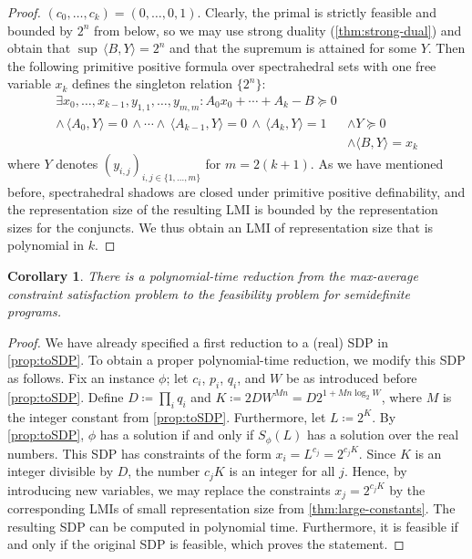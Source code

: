 \documentclass[11pt]{article}
\newtheorem{corollary}[theorem]{Corollary}
\theoremstyle{definition}
\theoremstyle{remark}
\begin{document}
\begin{proof}
    $(c_0,\dots,c_k) = (0,\dots,0,1)$. 
    Clearly, the primal is strictly feasible and bounded by $2^{n}$ from below, so we may use strong duality (\cref{thm:strong-dual})
    and obtain that $\sup \, \langle B,Y \rangle = 2^{n}$ and that the supremum is attained for some $Y$. 
    Then the following primitive positive formula over spectrahedral sets 
    with one free variable $x_k$ defines the singleton relation $\{2^{n}\}$: 
    \begin{align*}
        \exists x_0,\dots,x_{k-1}, y_{1,1},\dots,y_{m,m}: A_0 x_0 + \cdots + A_k - B \succeq 0 & \\
        \wedge \, \langle A_0,Y \rangle = 0 \, \wedge \cdots \wedge \, \langle A_{k-1},Y \rangle = 0 \, \wedge \, \langle A_k,Y \rangle = 1 
        & \wedge Y \succeq 0 \\
        & \wedge \langle B,Y \rangle = x_k 
    \end{align*}
    where $Y$ denotes $(y_{i,j})_{i,j \in \{1,\dots,m\}}$ for $m = 2(k+1)$. As we have mentioned before, spectrahedral shadows are closed under primitive positive definability, and the representation size of the resulting LMI is bounded by the representation sizes for the conjuncts. We thus obtain an LMI of 
    representation size that is polynomial in $k$.
\end{proof}

\begin{corollary}\label{cor:MaxAv-SDP}
    There is a polynomial-time reduction from the max-average constraint satisfaction problem to the feasibility problem for semidefinite programs. 
\end{corollary}
\begin{proof}
    We have already specified a first reduction to a (real) SDP in \cref{prop:toSDP}. 
    To obtain a proper polynomial-time reduction, we modify this SDP as follows. 
    Fix an instance $\phi$; let $c_i$, $p_i$, $q_i$, and $W$ be as introduced before \cref{prop:toSDP}. Define $D \coloneqq \prod_i q_i$ and $K \coloneqq 2D W^{Mn} = D2^{1 + Mn \log_2 W}$, where $M$ is the integer constant from \cref{prop:toSDP}. Furthermore, let $L \coloneqq 2^K$.
    By \cref{prop:toSDP}, $\phi$ has a solution if and only if $S_\phi(L)$ 
    has a solution over the real numbers.
    This SDP has constraints of the form $x_i = L^{c_j} = 2^{c_jK}$.
    Since $K$ is an integer divisible by $D$, the number $c_jK$ is an integer for all $j$. Hence, by introducing new variables, we may 
    replace the constraints $x_j = 2^{c_jK}$ by the corresponding LMIs of small representation size from \cref{thm:large-constants}.
    The resulting SDP can be computed in polynomial time. 
    Furthermore, it is feasible if and only if the original SDP is feasible, which proves the statement. 
    \end{proof}
\end{document}
